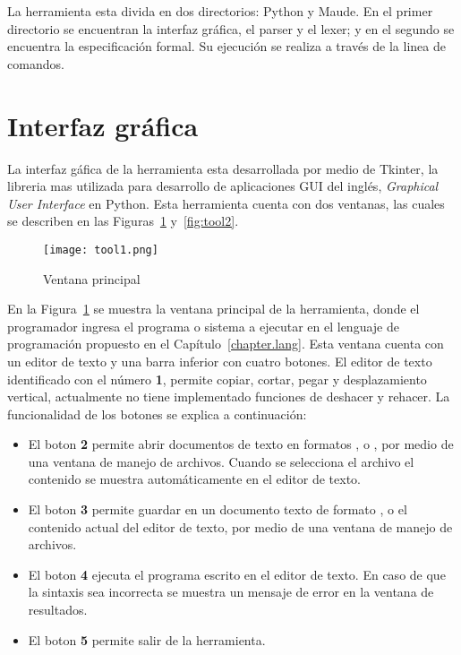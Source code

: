 La herramienta esta divida en dos directorios: Python y Maude. En el primer directorio se encuentran la interfaz gr\'afica, el parser y el lexer; y en el segundo se encuentra la especificaci\'on formal. Su ejecuci\'on se realiza a trav\'es de la linea de comandos.

\section{Interfaz gr\'afica}
\label{gui.envir}

La interfaz g\'afica de la herramienta esta desarrollada por medio de Tkinter, la libreria mas utilizada para desarrollo de aplicaciones GUI {del ingl\'es, \textit{Graphical User Interface}} en Python. Esta herramienta cuenta con dos ventanas, las cuales se describen en las Figuras~\ref{fig:tool1} y~\ref{fig:tool2}.

\begin{figure}[htbp] %
   \centering
   \texttt{[image: tool1.png]}
   \caption{Ventana principal}
   \label{fig:tool1}
\end{figure}

En la Figura~\ref{fig:tool1} se muestra la ventana principal de la herramienta, donde el programador ingresa el programa o sistema a ejecutar en el lenguaje de programaci\'on propuesto en el Cap\'itulo~\ref{chapter.lang}. Esta ventana cuenta con un editor de texto y una barra inferior con cuatro botones. El editor de texto identificado con el n\'umero \textbf{1}, permite copiar, cortar, pegar y desplazamiento vertical, actualmente no tiene implementado funciones de deshacer y rehacer. La funcionalidad de los botones se explica a continuaci\'on:

\begin{itemize}
\item El boton \textbf{2} permite abrir documentos de texto en formatos ,  o , por medio de una ventana de manejo de archivos. Cuando se selecciona el archivo el contenido se muestra autom\'aticamente en el editor de texto.
\item El boton \textbf{3} permite guardar en un documento texto de formato ,  o  el contenido actual del editor de texto, por medio de una ventana de manejo de archivos.
\item El boton \textbf{4} ejecuta el programa escrito en el editor de texto. En caso de que la sintaxis sea incorrecta se muestra un mensaje de error en la ventana de resultados.
\item El boton \textbf{5} permite salir de la herramienta. 
\end{itemize}

